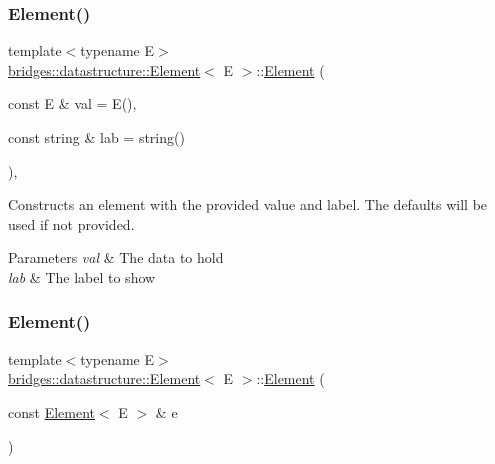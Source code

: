 \subsubsection{\texorpdfstring{Element()}{Element()}\hspace{0.1cm}{\footnotesize\ttfamily [1/2]}}
{\footnotesize\ttfamily template$<$typename E$>$ \\
\hyperlink{classbridges_1_1datastructure_1_1_element}{bridges\+::datastructure\+::\+Element}$<$ E $>$\+::\hyperlink{classbridges_1_1datastructure_1_1_element}{Element} (\begin{DoxyParamCaption}\item[{const E \&}]{val = {\ttfamily E()},  }\item[{const string \&}]{lab = {\ttfamily string()} }\end{DoxyParamCaption})\hspace{0.3cm}{\ttfamily [inline]}, {\ttfamily [explicit]}}

Constructs an element with the provided value and label. The defaults will be used if not provided.


\begin{DoxyParams}{Parameters}
{\em val} & The data to hold \\
\hline
{\em lab} & The label to show \\
\hline
\end{DoxyParams}
\mbox{\label{classbridges_1_1datastructure_1_1_element_a80eb6ac6925c4974c2e88e7e1446e231}} 
\subsubsection{\texorpdfstring{Element()}{Element()}\hspace{0.1cm}{\footnotesize\ttfamily [2/2]}}
{\footnotesize\ttfamily template$<$typename E$>$ \\
\hyperlink{classbridges_1_1datastructure_1_1_element}{bridges\+::datastructure\+::\+Element}$<$ E $>$\+::\hyperlink{classbridges_1_1datastructure_1_1_element}{Element} (\begin{DoxyParamCaption}\item[{const \hyperlink{classbridges_1_1datastructure_1_1_element}{Element}$<$ E $>$ \&}]{e }\end{DoxyParamCaption})\hspace{0.3cm}{\ttfamily [inline]}}

